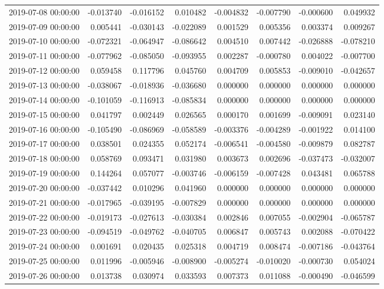 \begin{tabular}{lrrrrrrr}
2019-07-08 00:00:00 & -0.013740 & -0.016152 & 0.010482 & -0.004832 & -0.007790 & -0.000600 & 0.049932 \\
2019-07-09 00:00:00 & 0.005441 & -0.030143 & -0.022089 & 0.001529 & 0.005356 & 0.003374 & 0.009267 \\
2019-07-10 00:00:00 & -0.072321 & -0.064947 & -0.086642 & 0.004510 & 0.007442 & -0.026888 & -0.078210 \\
2019-07-11 00:00:00 & -0.077962 & -0.085050 & -0.093955 & 0.002287 & -0.000780 & 0.004022 & -0.007700 \\
2019-07-12 00:00:00 & 0.059458 & 0.117796 & 0.045760 & 0.004709 & 0.005853 & -0.009010 & -0.042657 \\
2019-07-13 00:00:00 & -0.038067 & -0.018936 & -0.036680 & 0.000000 & 0.000000 & 0.000000 & 0.000000 \\
2019-07-14 00:00:00 & -0.101059 & -0.116913 & -0.085834 & 0.000000 & 0.000000 & 0.000000 & 0.000000 \\
2019-07-15 00:00:00 & 0.041797 & 0.002449 & 0.026565 & 0.000170 & 0.001699 & -0.009091 & 0.023140 \\
2019-07-16 00:00:00 & -0.105490 & -0.086969 & -0.058589 & -0.003376 & -0.004289 & -0.001922 & 0.014100 \\
2019-07-17 00:00:00 & 0.038501 & 0.024355 & 0.052174 & -0.006541 & -0.004580 & -0.009879 & 0.082787 \\
2019-07-18 00:00:00 & 0.058769 & 0.093471 & 0.031980 & 0.003673 & 0.002696 & -0.037473 & -0.032007 \\
2019-07-19 00:00:00 & 0.144264 & 0.057077 & -0.003746 & -0.006159 & -0.007428 & 0.043481 & 0.065788 \\
2019-07-20 00:00:00 & -0.037442 & 0.010296 & 0.041960 & 0.000000 & 0.000000 & 0.000000 & 0.000000 \\
2019-07-21 00:00:00 & -0.017965 & -0.039195 & -0.007829 & 0.000000 & 0.000000 & 0.000000 & 0.000000 \\
2019-07-22 00:00:00 & -0.019173 & -0.027613 & -0.030384 & 0.002846 & 0.007055 & -0.002904 & -0.065787 \\
2019-07-23 00:00:00 & -0.094519 & -0.049762 & -0.040705 & 0.006847 & 0.005743 & 0.002088 & -0.070422 \\
2019-07-24 00:00:00 & 0.001691 & 0.020435 & 0.025318 & 0.004719 & 0.008474 & -0.007186 & -0.043764 \\
2019-07-25 00:00:00 & 0.011996 & -0.005946 & -0.008900 & -0.005274 & -0.010020 & -0.000730 & 0.054024 \\
2019-07-26 00:00:00 & 0.013738 & 0.030974 & 0.033593 & 0.007373 & 0.011088 & -0.000490 & -0.046599 \\

\end{tabular}
